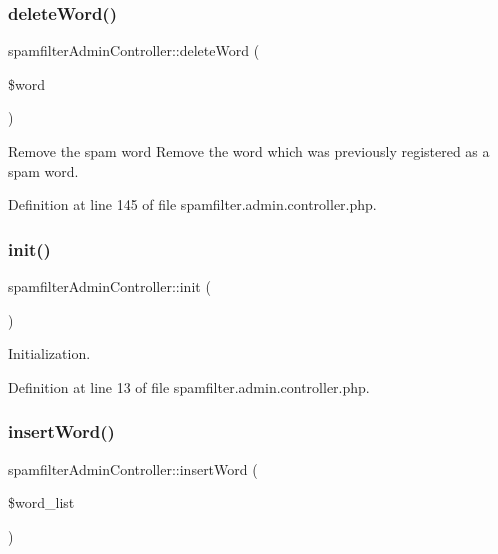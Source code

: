 \subsubsection{\texorpdfstring{delete\+Word()}{deleteWord()}}
{\footnotesize\ttfamily spamfilter\+Admin\+Controller\+::delete\+Word (\begin{DoxyParamCaption}\item[{}]{\$word }\end{DoxyParamCaption})}



Remove the spam word Remove the word which was previously registered as a spam word. 



Definition at line 145 of file spamfilter.\+admin.\+controller.\+php.

\mbox{\label{classspamfilterAdminController_a28483831891491011017a8527221e3f3}} 
\subsubsection{\texorpdfstring{init()}{init()}}
{\footnotesize\ttfamily spamfilter\+Admin\+Controller\+::init (\begin{DoxyParamCaption}{ }\end{DoxyParamCaption})}



Initialization. 



Definition at line 13 of file spamfilter.\+admin.\+controller.\+php.

\mbox{\label{classspamfilterAdminController_ada3859c56fb148b0e4f33266121051c0}} 
\subsubsection{\texorpdfstring{insert\+Word()}{insertWord()}}
{\footnotesize\ttfamily spamfilter\+Admin\+Controller\+::insert\+Word (\begin{DoxyParamCaption}\item[{}]{\$word\+\_\+list }\end{DoxyParamCaption})}




